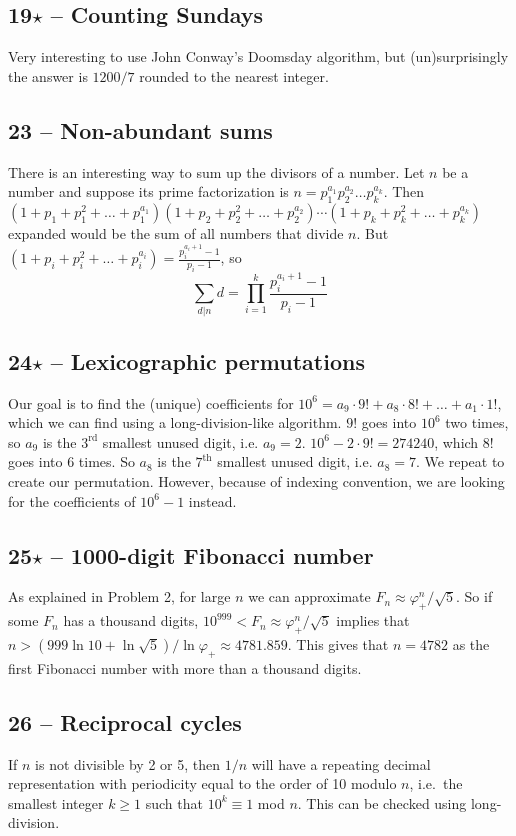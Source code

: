 \documentclass{article}
\begin{document}
\subsection*{19$\star$ -- Counting Sundays} 
Very interesting to use John Conway's Doomsday algorithm, but (un)surprisingly the answer is $1200/7$ rounded to the nearest integer.

\subsection*{23 -- Non-abundant sums} 
There is an interesting way to sum up the divisors of a number. 
Let $n$ be a number and suppose its prime factorization is $n = p_1^{a_1} p_2^{a_2} \dotso p_k^{a_k}$. 
Then $(1+p_1+p_1^2+\dotso+p_1^{a_1})(1+p_2+p_2^2+\dotso+p_2^{a_2}) \cdots (1+p_k+p_k^2+\dotso+p_k^{a_k})$ expanded would be the sum of all numbers that divide $n$. 
But $(1+p_i+p_i^2+\dotso+p_i^{a_i}) = \frac{p_i^{a_i+1}-1}{p_i-1}$, so 
\[ \sum_{d|n} d = \prod_{i=1}^k \frac{p_i^{a_i+1}-1}{p_i-1} \]

\subsection*{24$\star$ -- Lexicographic permutations} 
Our goal is to find the (unique) coefficients for $10^6 = a_9\cdot9! + a_8\cdot8! + \dotso + a_1\cdot1!$, which we can find using a long-division-like algorithm. 
$9!$ goes into $10^6$ two times, so $a_9$ is the $3^\text{rd}$ smallest unused digit, i.e. $a_9 = 2$. 
$10^6 - 2 \cdot 9! = 274240$, which $8!$ goes into 6 times.
So $a_8$ is the $7^\text{th}$ smallest unused digit, i.e. $a_8 = 7$. 
We repeat to create our permutation. 
However, because of indexing convention, we are looking for the coefficients of $10^6 - 1$ instead.

\subsection*{25$\star$ -- 1000-digit Fibonacci number} 
As explained in Problem 2, for large $n$ we can approximate $F_n \approx \varphi_+^n / \sqrt{5}$. 
So if some $F_n$ has a thousand digits, $10^{999} < F_n \approx \varphi_+^n / \sqrt{5}$ implies that $n > (999 \ln 10 + \ln \sqrt{5})/ \ln \varphi_+ \approx 4781.859$. 
This gives that $n = \boxed{4782}$ as the first Fibonacci number with more than a thousand digits.

\subsection*{26 -- Reciprocal cycles} 
If $n$ is not divisible by 2 or 5, then $1/n$ will have a repeating decimal representation with periodicity equal to the order of 10 modulo $n$, i.e.~the smallest integer $k \geq 1$ such that $10^k \equiv 1$ mod $n$. 
This can be checked using long-division. 
\end{document}
